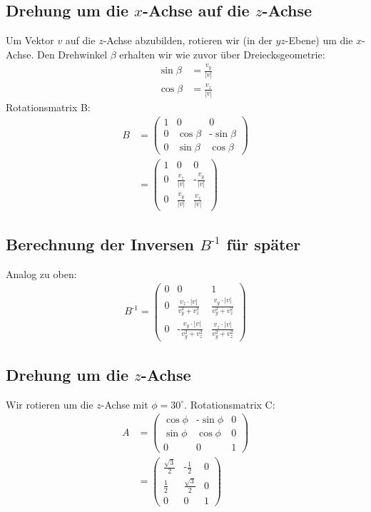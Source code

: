 \documentclass[a4paper]{scrartcl}
\begin{document}
\subsection*{Drehung um die $x$-Achse auf die $z$-Achse}
Um Vektor $v$ auf die $z$-Achse abzubilden, rotieren wir (in der $yz$-Ebene) um die $x$-Achse. Den Drehwinkel $\beta$ erhalten wir wie zuvor über Dreiecksgeometrie:
\begin{align*}
\sin\beta & = \frac{v_y}{\left|v\right|} \\
\cos\beta & = \frac{v_z}{\left|v\right|}
\end{align*}
Rotationsmatrix B:
\begin{align*}
B & = \begin{pmatrix} 1 & 0 & 0 \\ 0 & \cos\beta & \text{-}\sin\beta\\ 0 & \sin\beta & \cos\beta \end{pmatrix}
\\
& = \begin{pmatrix} 1 & 0 & 0 \\ 0 & \frac{v_z}{\left|v\right|} & \text{-}\frac{v_y}{\left|v\right|} \\ 0 & \frac{v_y}{\left|v\right|} & \frac{v_z}{\left|v\right|} \end{pmatrix}
\end{align*}

\subsection*{Berechnung der Inversen $B^{\text{-}1}$ für später}
Analog zu oben:
\begin{align*}
B^{\text{-}1} = 
\begin{pmatrix}
0 & 0 & 1 \\
0 & \frac{v_z \cdot \left|v\right|}{v_y^2 + v_z^2} & \frac{v_y \cdot \left|v\right|}{v_y^2 + v_z^2}\\
0 & \text{-}\frac{v_y \cdot \left|v\right|}{v_y^2 + v_z^2} & \frac{v_z \cdot \left|v\right|}{v_y^2 + v_z^2}
\end{pmatrix}
\end{align*}

\subsection*{Drehung um die $z$-Achse}
Wir rotieren um die $z$-Achse mit $\phi = 30^\circ$. Rotationsmatrix C:
\begin{align*}
A & = \begin{pmatrix} \cos\phi & \text{-}\sin\phi & 0 \\ \sin\phi & \cos\phi & 0 \\ 0 & 0 & 1 \end{pmatrix}
\\
& = \begin{pmatrix} \frac{\sqrt{3}}{2} & \text{-}\frac{1}{2} & 0 \\ \frac{1}{2} & \frac{\sqrt{3}}{2} & 0 \\ 0 & 0 & 1\end{pmatrix}
\end{align*}
\end{document}
